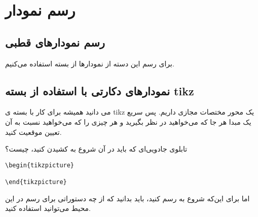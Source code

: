 \section{رسم نمودار}
\subsection{رسم نمودارهای قطبی}
برای رسم این دسته از نمودارها از بسته  استفاده می‌کنیم.
%
\subsection{نمودارهای دکارتی با استفاده از بسته tikz}
می دانید 
همیشه برای کار با بسته ی  tikz یک محور مختصات مجازی داریم.
پس سریع یک  مبدا هر جا که می‌خواهید در نظر بگیرید و هر چیزی را که می‌خواهید نسبت به آن تعیین موقعیت کنید.

تابلوی جادویی‌ای که باید در آن شروع به کشیدن کنید، چیست؟

\begin{latin}
\begin{lstlisting}[frame=trBL]
\begin{tikzpicture}

\end{tikzpicture}
\end{lstlisting}
\end{latin}
اما برای این‌که شروع به رسم کنید، باید بدانید که از چه دستوراتی برای رسم در این محیط می‌توانید استفاده کنید.

